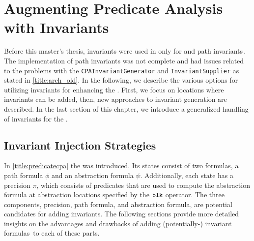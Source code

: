 \chapter{Augmenting Predicate Analysis with Invariants}
Before this master's thesis, invariants were used in \CPAchecker{} only for \Kinduction{} and path invariants\,. The 
implementation of path invariants was not complete and had issues related to the problems with the \texttt{CPAInvariantGenerator} and \texttt{InvariantSupplier} as stated in 
\autoref{title:arch_old}. In the following, we describe the various options for utilizing invariants for enhancing the \PredicateCPA{}. First, we focus on locations where invariants
can be added, then, new approaches to invariant generation are described. In the last section of this chapter, we introduce a generalized handling of invariants for the \PredicateCPA{}.

\section{Invariant Injection Strategies}
In \autoref{title:predicatecpa} the \PredicateCPA{} was introduced. Its states consist of two formulas, a path formula $\phi$ and an abstraction formula $\psi$. Additionally, each state has a 
precision $\pi$, which consists of predicates that are used to compute the abstraction formula at abstraction locations specified by the $\mathtt{blk}{}$ operator. The three components, precision,
path formula, and abstraction formula, 
are potential candidates for adding invariants. The following sections provide more detailed insights on the advantages and drawbacks of adding (potentially-) invariant
formulas\, to each of these parts.


